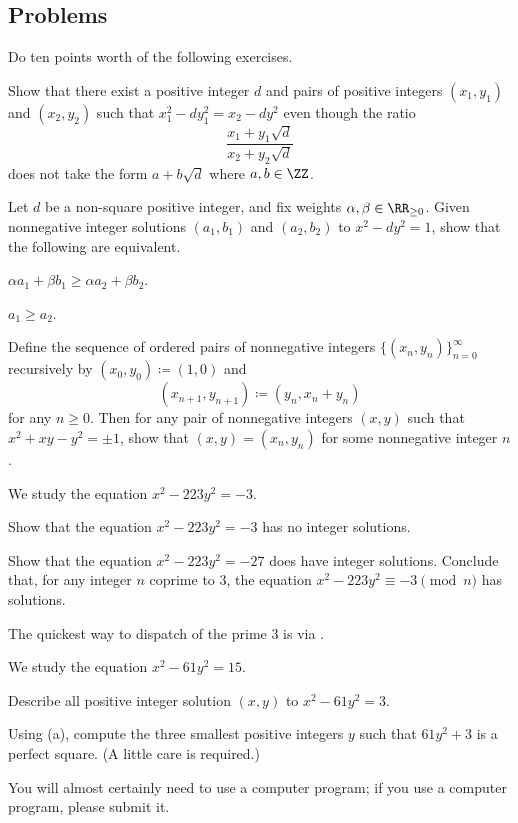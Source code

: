 \documentclass[../notes.tex]{subfiles}
\begin{document}
\subsection{Problems}
Do ten points worth of the following exercises.
\begin{prob}[2 points] \label{prob:norm-equal-not-unit-ratio}
	Show that there exist a positive integer $d$ and pairs of positive integers $(x_1,y_1)$ and $(x_2,y_2)$ such that $x_1^2-dy_1^2=x_2-dy^2$ even though the ratio
	\[\frac{x_1+y_1\sqrt d}{x_2+y_2\sqrt d}\]
	does not take the form $a+b\sqrt d$ where $a,b\in\ZZ$.
\end{prob}
\begin{prob}[2 points] \label{prob:fund-unit-is-really-smallest}
	Let $d$ be a non-square positive integer, and fix weights $\alpha,\beta\in\RR_{\ge0}$. Given nonnegative integer solutions $(a_1,b_1)$ and $(a_2,b_2)$ to $x^2-dy^2=1$, show that the following are equivalent.
	\begin{listalph}
		\item $\alpha a_1+\beta b_1\ge\alpha a_2+\beta b_2$.
		\item $a_1\ge a_2$.
	\end{listalph}
\end{prob}
\begin{prob}[4 points] \label{prob:pell-5-norm}
	Define the sequence of ordered pairs of nonnegative integers $\{(x_n,y_n)\}_{n=0}^\infty$ recursively by $(x_0,y_0)\coloneqq(1,0)$ and
	\[(x_{n+1},y_{n+1})\coloneqq(y_n,x_n+y_n)\]
	for any $n\ge0$. Then for any pair of nonnegative integers $(x,y)$ such that $x^2+xy-y^2=\pm1$, show that $(x,y)=(x_n,y_n)$ for some nonnegative integer $n$.
\end{prob}
\begin{prob}[4 points] \label{prob:norm-223}
	We study the equation $x^2-223y^2=-3$.
	\begin{listalph}
		\item Show that the equation $x^2-223y^2=-3$ has no integer solutions.
		\item Show that the equation $x^2-223y^2=-27$ does have integer solutions. Conclude that, for any integer $n$ coprime to $3$, the equation $x^2-223y^2\equiv-3\pmod n$  has solutions.
	\end{listalph}
	The quickest way to dispatch of the prime $3$ is via .
\end{prob}
\begin{prob}[5 points]
	We study the equation $x^2-61y^2=15$.
	\begin{listalph}
		\item Describe all positive integer solution $(x,y)$ to $x^2-61y^2=3$.
		\item Using (a), compute the three smallest positive integers $y$ such that $61y^2+3$ is a perfect square. (A little care is required.)
	\end{listalph}
	You will almost certainly need to use a computer program; if you use a computer program, please submit it.
\end{prob}
\end{document}
